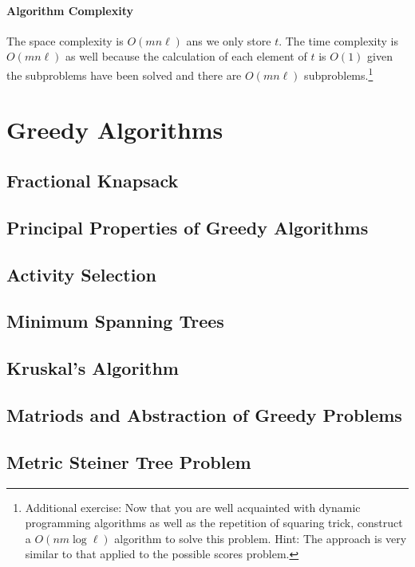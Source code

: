\documentclass[10pt]{article}
\theoremstyle{plain}
\theoremstyle{definition}
\numberwithin{equation}{section}
\numberwithin{figure}{section}
\begin{document}
\paragraph{Algorithm Complexity} The space complexity is $O(mn\ell)$ ans we only store $t$. The time complexity is $O(mn\ell)$ as well because the calculation of each element of $t$ is $O(1)$ given the subproblems have been solved and there are $O(mn\ell)$ subproblems.\footnote{Additional exercise: Now that you are well acquainted with dynamic programming algorithms as well as the repetition of squaring trick, construct a $O(n m \log \ell)$ algorithm to solve this problem. Hint: The approach is very similar to that applied to the possible scores problem.}

\newpage
\section{Greedy Algorithms}

\subsection{Fractional Knapsack}

\subsection{Principal Properties of Greedy Algorithms}

\subsection{Activity Selection}

\subsection{Minimum Spanning Trees}

\subsection{Kruskal's Algorithm}

\subsection{Matriods and Abstraction of Greedy Problems}

\subsection{Metric Steiner Tree Problem}
\end{document}
